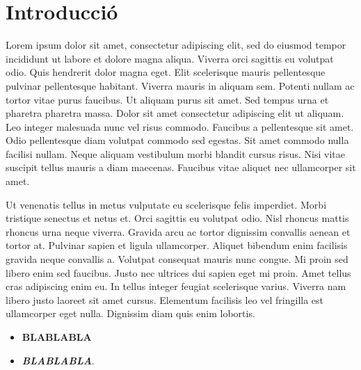 \section{Introducció}\label{sec:intro}


Lorem ipsum dolor sit amet, consectetur adipiscing elit, sed do eiusmod tempor incididunt ut labore et dolore magna aliqua. Viverra orci sagittis eu volutpat odio. Quis hendrerit dolor magna eget. Elit scelerisque mauris pellentesque pulvinar pellentesque habitant. Viverra mauris in aliquam sem. Potenti nullam ac tortor vitae purus faucibus. Ut aliquam purus sit amet. Sed tempus urna et pharetra pharetra massa. Dolor sit amet consectetur adipiscing elit ut aliquam. Leo integer malesuada nunc vel risus commodo. Faucibus a pellentesque sit amet. Odio pellentesque diam volutpat commodo sed egestas. Sit amet commodo nulla facilisi nullam. Neque aliquam vestibulum morbi blandit cursus risus. Nisi vitae suscipit tellus mauris a diam maecenas. Faucibus vitae aliquet nec ullamcorper sit amet.

Ut venenatis tellus in metus vulputate eu scelerisque felis
imperdiet. Morbi tristique senectus et netus et. Orci sagittis eu
volutpat odio. Nisl rhoncus mattis rhoncus urna neque viverra. Gravida
arcu ac tortor dignissim convallis aenean et tortor at. Pulvinar
sapien et ligula ullamcorper. Aliquet bibendum enim facilisis gravida
neque convallis a. Volutpat consequat mauris nunc congue. Mi proin sed
libero enim sed faucibus. Justo nec ultrices dui sapien eget mi
proin. Amet tellus cras adipiscing enim eu. In tellus integer feugiat
scelerisque varius. Viverra nam libero justo laoreet sit amet
cursus. Elementum facilisis leo vel fringilla est ullamcorper eget
nulla. Dignissim diam quis enim lobortis.

\begin{itemize}
\item  \textbf{BLABLABLA}
\item  \textit{\textbf{BLABLABLA}}.
\end{itemize}
